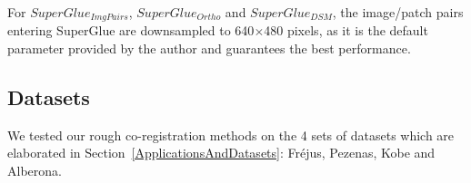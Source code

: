 For $SuperGlue_{ImgPairs}$, $SuperGlue_{Ortho}$ and $SuperGlue_{DSM}$, the image/patch pairs entering SuperGlue are downsampled to 640$\times$480 pixels, as it is the default parameter provided by the author and guarantees the best performance. 


\subsection{Datasets}
\label{Datasets}
We tested our rough co-registration methods on the 4 sets of datasets which are elaborated in Section~\ref{ApplicationsAndDatasets}: Fr{\'e}jus, Pezenas, Kobe and Alberona.

